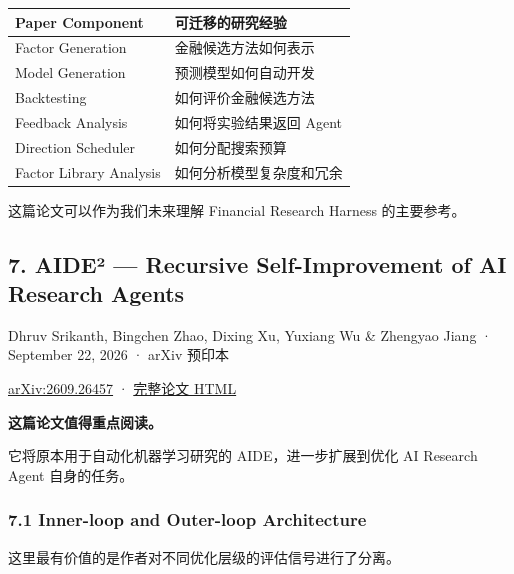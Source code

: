 \begin{readertable}
\begin{longtable}[]{@{}
  >{\raggedright\arraybackslash}p{}
  >{\raggedright\arraybackslash}p{}@{}}
\toprule
Paper Component & 可迁移的研究经验 \\
\midrule
\endhead
Factor Generation & 金融候选方法如何表示 \\
Model Generation & 预测模型如何自动开发 \\
Backtesting & 如何评价金融候选方法 \\
Feedback Analysis & 如何将实验结果返回 Agent \\
Direction Scheduler & 如何分配搜索预算 \\
Factor Library Analysis & 如何分析模型复杂度和冗余 \\
\bottomrule
\end{longtable}
\end{readertable}

这篇论文可以作为我们未来理解 Financial Research Harness 的主要参考。

\hypertarget{part-3-44-0001-aideuxb2-recursive-self-improvement-of-ai-research-agents}{%
\subsection{7. AIDE² --- Recursive Self-Improvement of AI Research Agents}\label{part-3-44-0001-aideuxb2-recursive-self-improvement-of-ai-research-agents}}

Dhruv Srikanth, Bingchen Zhao, Dixing Xu, Yuxiang Wu \& Zhengyao Jiang · September 22, 2026 · arXiv 预印本

\href{https://arxiv.org/abs/2609.26457}{arXiv:2609.26457} · \href{https://arxiv.org/html/2609.26457v1}{完整论文 HTML}

\textbf{这篇论文值得重点阅读。}

它将原本用于自动化机器学习研究的 AIDE，进一步扩展到优化 AI Research Agent 自身的任务。

\hypertarget{part-3-44-0001-inner-loop-and-outer-loop-architecture}{%
\subsubsection{7.1 Inner-loop and Outer-loop Architecture}\label{part-3-44-0001-inner-loop-and-outer-loop-architecture}}

这里最有价值的是作者对不同优化层级的评估信号进行了分离。

